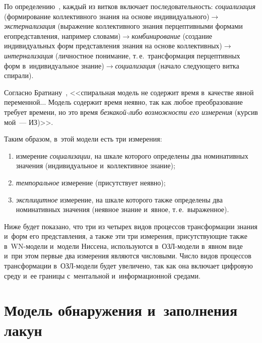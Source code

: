 {\begin{multicols}{2}
  
  По определению~\cite{4-zac, 6-zac}, каждый из витков включает 
последовательность: \textit{социализация} (формирование коллективного 
знания на основе  
ин\-ди\-ви\-ду\-аль\-но\-го)\;$\to$\;\textit{экс\-тер\-на\-ли\-за\-ция} (выражение 
коллективного знания перцептивными формами его\linebreak представления, например  
сло\-ва\-ми)\;$\to$\;\textit{ком\-би\-ни\-ро\-ва\-ние} (создание индивидуальных 
форм пред\-став\-ле\-ния знания на основе  
кол\-лек\-тив\-ных)\;$\to$\;\textit{ин\-тер\-на\-ли\-за\-ция} (личностное 
понимание, т.\,е.\ \mbox{трансформация} перцептивных форм в~индивидуальное  
зна\-ние)\;$\to$\;\textit{со\-циа\-ли\-за\-ция} (начало следующего витка спирали). 

Согласно Братиану~\cite{12-zac}, <<спиральная модель не содержит время 
в~качестве явной переменной$\ldots$ Модель содержит время неявно, так как 
любое преобразование требует времени, но это время \textit{без\linebreak ка\-кой-ли\-бо 
возможности его измерения} (курсив мой~--- ИЗ)>>. 

Таким образом, в~этой 
модели есть три измерения:
  \begin{enumerate}[(1)]
\item измерение \textit{социализации}, на шкале которого определены два 
номинативных значения (индивидуальное и~коллективное знание);
\item \textit{темпоральное} измерение (присутствует неявно);
\item \textit{эксплицитное} измерение, на шкале которого также 
определены два номинативных значения (неявное знание и~явное, т.\,е.\ 
выраженное).
\end{enumerate}

  Ниже будет показано, что три из четырех видов процессов трансформации 
знания и~форм его представления, а также эти три измерения, присутствующие 
также в~WN-мо\-де\-ли и~модели Ниссена, используются в~ОЗЛ-мо\-де\-ли 
в~явном виде и~при этом первые два измерения являются числовыми. Чис\-ло 
видов процессов трансформации в~ОЗЛ-мо\-де\-ли будет увеличено, так как она 
включает цифровую среду и~ее границы с~ментальной и~информационной 
средами.


  
\section{Модель обнаружения и~заполнения лакун}

\vspace*{-10pt}
    

\end{multicols}}
